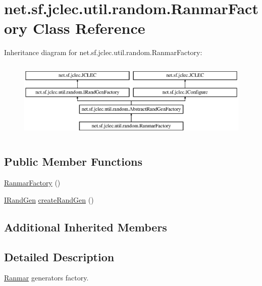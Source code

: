\hypertarget{classnet_1_1sf_1_1jclec_1_1util_1_1random_1_1_ranmar_factory}{\section{net.\-sf.\-jclec.\-util.\-random.\-Ranmar\-Factory Class Reference}
\label{classnet_1_1sf_1_1jclec_1_1util_1_1random_1_1_ranmar_factory}
}
Inheritance diagram for net.\-sf.\-jclec.\-util.\-random.\-Ranmar\-Factory\-:\begin{figure}[H]
\begin{center}
\leavevmode
\includegraphics[height=3.796610cm]{classnet_1_1sf_1_1jclec_1_1util_1_1random_1_1_ranmar_factory}
\end{center}
\end{figure}
\subsection*{Public Member Functions}
\begin{DoxyCompactItemize}
\item 
\hyperlink{classnet_1_1sf_1_1jclec_1_1util_1_1random_1_1_ranmar_factory_aca78402eb30b5044a94f2707f728427e}{Ranmar\-Factory} ()
\item 
\hyperlink{interfacenet_1_1sf_1_1jclec_1_1util_1_1random_1_1_i_rand_gen}{I\-Rand\-Gen} \hyperlink{classnet_1_1sf_1_1jclec_1_1util_1_1random_1_1_ranmar_factory_aaf75da8f74d0879361433244e0943663}{create\-Rand\-Gen} ()
\end{DoxyCompactItemize}
\subsection*{Additional Inherited Members}


\subsection{Detailed Description}
\hyperlink{classnet_1_1sf_1_1jclec_1_1util_1_1random_1_1_ranmar}{Ranmar} generators factory.

